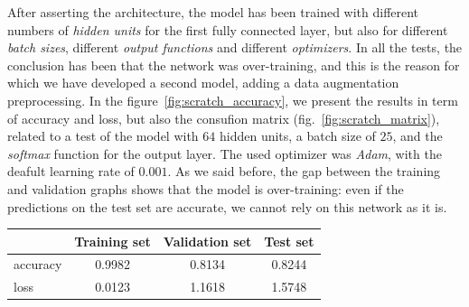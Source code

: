 \documentclass[11pt,a4paper,oneside]{article}
\begin{document}
After asserting the architecture, the model has been trained with different numbers of \textit{hidden units} for the first fully connected layer, but also for different \textit{batch sizes}, different \textit{output functions} and different \textit{optimizers}. 
In all the tests, the conclusion has been that the network was over-training, and this is the reason for which we have developed a second model, adding a data augmentation preprocessing. 
In the figure~\ref{fig:scratch_accuracy}, we present the results in term of accuracy and loss, but also the consufion matrix (fig.~\ref{fig:scratch_matrix}), related to a test of the model with $64$ hidden units, a batch size of $25$, and the \textit{softmax} function for the output layer. 
The used optimizer was \textit{Adam}, with the deafult learning rate of $0.001$. As we said before, the gap between the training and validation graphs shows that the model is over-training: even if the predictions on the test set are accurate, we cannot rely on this network as it is.

\begin{center}
\begin{tabular}{|l|ccc|}
\hline
 & Training set & Validation set & Test set \\
\hline
accuracy & 0.9982 & 0.8134 & 0.8244 \\
loss & 0.0123 & 1.1618 & 1.5748 \\
\hline
\end{tabular}
\end{center}
\end{document}
